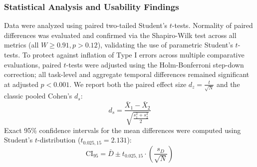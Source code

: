 \documentclass[11pt,a4paper]{article}
\begin{document}
\subsubsection{Statistical Analysis and Usability Findings}

Data were analyzed using paired two-tailed Student's $t$-tests. Normality of paired differences was evaluated and confirmed via the Shapiro-Wilk test across all metrics (all $W \ge 0.91, p > 0.12$), validating the use of parametric Student's $t$-tests. To protect against inflation of Type I errors across multiple comparative evaluations, paired $t$-tests were adjusted using the Holm-Bonferroni step-down correction; all task-level and aggregate temporal differences remained significant at adjusted $p < 0.001$. We report both the paired effect size $d_z = \frac{t}{\sqrt{N}}$ and the classic pooled Cohen's $d_s$:
\begin{equation}
    d_s = \frac{\bar{X}_1 - \bar{X}_2}{\sqrt{\frac{s_1^2 + s_2^2}{2}}}
\end{equation}
Exact 95\% confidence intervals for the mean differences were computed using Student's $t$-distribution ($t_{0.025, 15} = 2.131$):
\begin{equation}
    \text{CI}_{95} = \bar{D} \pm t_{0.025, 15} \cdot \left(\frac{s_D}{\sqrt{N}}\right)
\end{equation}
\end{document}
